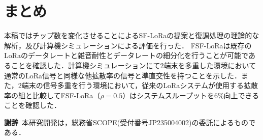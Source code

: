 \documentclass[technicalreport]{ieicej}
\begin{document}






\section{まとめ}
本稿ではチップ数を変化させることによるSF-LoRaの提案と復調処理の理論的な解析，及び計算機シミュレーションによる評価を行った．
FSF-LoRaは既存のLoRaのデータレートと雑音耐性とデータレートの細分化を行うことが可能であることを確認した．計算機シミュレーションにて2端末を多重した環境において通常のLoRa信号と同様な他拡散率の信号と準直交性を持つことを示した．また，2端末の信号多重を行う環境において，従来のLoRaシステムが使用する拡散率の組と比較してFSF-LoRa（$\rho=0.5$）はシステムスループットを6\%向上できることを確認した．

\begin{spacing}{1}
  {\textbf{謝辞}\ 本研究開発は，総務省SCOPE(受付番号JP235004002)の委託によるものである．}
\end{spacing}






%
%



\end{document}
